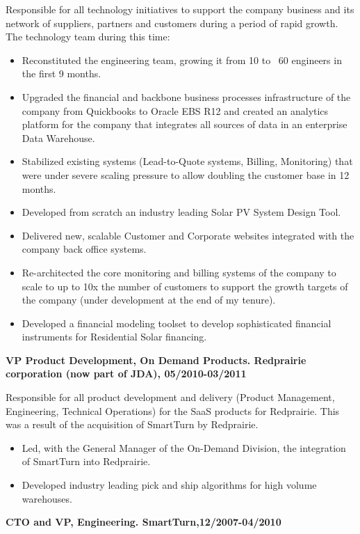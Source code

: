 \documentclass{res}
\begin{document}
\begin{resume}
Responsible for all technology initiatives to support the company business and its network of suppliers, partners and customers during a period of rapid growth. The technology team during this time:
\begin{itemize}
    \item Reconstituted the engineering team, growing it from 10 to ~60 engineers in the first 9 months.
    \item Upgraded the financial and backbone business processes infrastructure of the company from Quickbooks to Oracle EBS R12 and created an analytics platform for the company that integrates all sources of data in an enterprise Data Warehouse.
    \item Stabilized existing systems (Lead-to-Quote systems, Billing, Monitoring) that were under severe scaling pressure to allow doubling the  customer base in 12 months.
    \item Developed from scratch an industry leading Solar PV System Design Tool.
    \item Delivered new, scalable Customer and Corporate websites integrated with the company back office systems.
    \item Re-architected the core monitoring and billing systems of the company to scale to up to 10x the number of customers to support the growth targets of the company (under development at the end of my tenure).
    \item Developed a financial modeling toolset to develop sophisticated financial instruments for Residential Solar financing.
\end{itemize}


{\bf VP Product Development, On Demand Products. Redprairie corporation (now part of JDA), 05/2010-03/2011}

Responsible for all product development and delivery (Product Management, Engineering, Technical Operations) for the SaaS products for Redprairie. This was a result of the acquisition of SmartTurn by Redprairie.
\begin{itemize}
    \item Led, with the General Manager of the On-Demand Division, the integration of SmartTurn into Redprairie.
    \item Developed industry leading pick and ship algorithms for high volume warehouses.
\end{itemize}

{\bf CTO and VP, Engineering. SmartTurn,12/2007-04/2010}
    

\end{resume}
\end{document}
